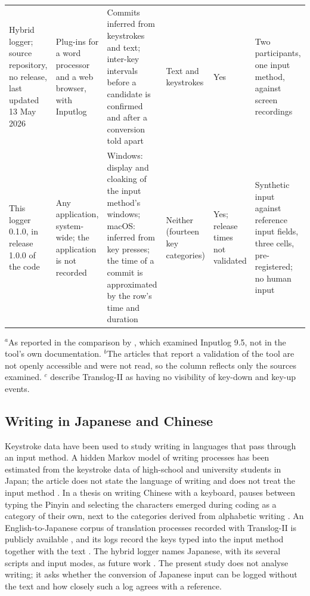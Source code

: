 \begin{landscape}
{\begin{longtable}{L{0.17}L{0.14}L{0.19}L{0.14}L{0.13}L{0.21}}
Hybrid logger; source repository, no release, last updated 13 May 2026 \citep{hylog-repo} & Plug-ins for a word processor and a web browser, with Inputlog \citep{crotti2026} & Commits inferred from keystrokes and text; inter-key intervals before a candidate is confirmed and after a conversion told apart \citep{crotti2026} & Text and keystrokes \citep{crotti2026} & Yes \citep{crotti2026} & Two participants, one input method, against screen recordings \citep{crotti2026} \\
This logger 0.1.0, in release 1.0.0 of the code \citep{release} & Any application, system-wide; the application is not recorded & Windows: display and cloaking of the input method's windows; macOS: inferred from key presses; the time of a commit is approximated by the row's time and duration & Neither (fourteen key categories) & Yes; release times not validated & Synthetic input against reference input fields, three cells, pre-registered; no human input \\
\bottomrule
\end{longtable}
\par\smallskip\footnotesize
$^{a}$As reported in the comparison by \citet{crotti2026}, which examined Inputlog 9.5, not in the tool's own
documentation.
$^{b}$The articles that report a validation of the tool are not openly accessible and were not read, so the column
reflects only the sources examined.
$^{c}$\citet{crotti2026} describe Translog-II as having no visibility of key-down and key-up events.\par
}
\end{landscape}

\subsection{Writing in Japanese and Chinese}
\label{sec:related-cjk}

Keystroke data have been used to study writing in languages that pass through an input method. A hidden Markov model
of writing processes has been estimated from the keystroke data of high-school and university students in Japan; the
article does not state the language of writing and does not treat the input method \citep{uto2020}. In a thesis on writing Chinese with a keyboard, pauses between typing the Pinyin and selecting the
characters emerged during coding as a category of their own, next to the categories derived from alphabetic writing
\citep{lu2020}. An English-to-Japanese corpus of translation processes recorded with Translog-II is publicly available
\citep{carl2016}, and its logs record the keys typed into the input method together with the text
\citep{tprdb-enja15}. The hybrid logger names Japanese, with its several scripts and input modes, as future work
\citep{crotti2026}. The present study does not analyse writing; it asks whether the conversion of Japanese input can be
logged without the text and how closely such a log agrees with a reference.

